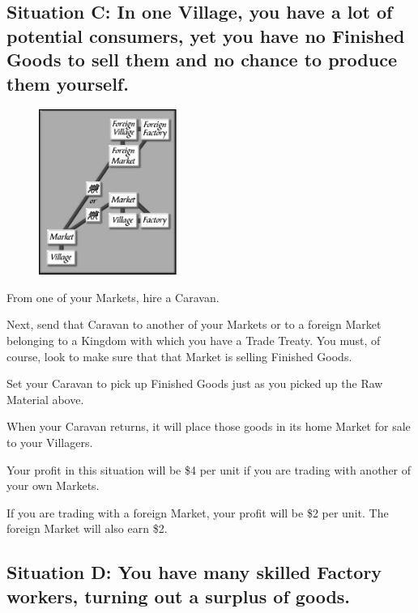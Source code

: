 \subsection{Situation C: In one Village, you have a lot of potential consumers, yet you have no Finished Goods to sell them and no chance to produce them yourself.}

\begin{figure}
	\vspace{-20pt}
	\begin{center}
		\includegraphics[width=0.4\textwidth]{Itradesit3}
	\end{center}
	\vspace{-20pt}
\end{figure}

From one of your Markets, hire a Caravan.

Next, send that Caravan to another of your Markets or to a foreign Market belonging to a Kingdom with which you have a Trade Treaty. You must, of course, look to make sure that that Market is selling Finished Goods.

Set your Caravan to pick up Finished Goods just as you picked up the Raw Material above.

When your Caravan returns, it will place those goods in its home Market for sale to your Villagers.

Your profit in this situation will be \$4 per unit if you are trading with another of your own Markets.

If you are trading with a foreign Market, your profit will be \$2 per unit. The foreign Market will also earn \$2.

\clearpage

\subsection{Situation D: You have many skilled Factory workers, turning out a surplus of goods.}

